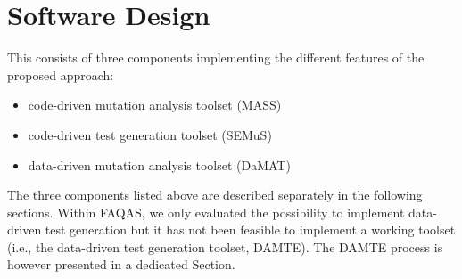 
\chapter{Software Design}

This \FAQAS consists of three components implementing the different features of the proposed approach:
\begin{itemize}
	\item code-driven mutation analysis toolset (MASS)
	\item code-driven test generation toolset (SEMuS)
	\item data-driven mutation analysis toolset (DaMAT)
\end{itemize}

The three components listed above are described separately in the following sections. Within FAQAS, we only evaluated the possibility to implement data-driven test generation but it has not been feasible to implement a working toolset (i.e., the data-driven test generation toolset, DAMTE). The DAMTE process is however presented in a dedicated Section.





\clearpage